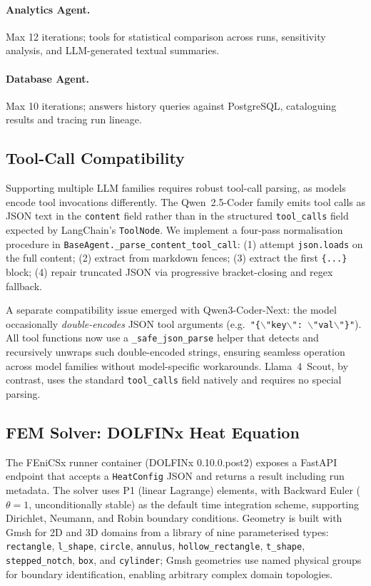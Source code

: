 \documentclass[twocolumn]{article}
\begin{document}
\paragraph{Analytics Agent.}
Max 12 iterations; tools for statistical comparison across runs,
sensitivity analysis, and LLM-generated textual summaries.

\paragraph{Database Agent.}
Max 10 iterations; answers history queries against PostgreSQL,
cataloguing results and tracing run lineage.

\subsection{Tool-Call Compatibility}
\label{sec:tool-compat}

Supporting multiple LLM families requires robust tool-call parsing, as
models encode tool invocations differently.  The Qwen~2.5-Coder family
emits tool calls as JSON text in the \texttt{content} field rather than in
the structured \texttt{tool\_calls} field expected by LangChain's
\texttt{ToolNode}.  We implement a four-pass normalisation procedure in
\texttt{BaseAgent.\_parse\_content\_tool\_call}:
(1) attempt \texttt{json.loads} on the full content;
(2) extract from markdown fences;
(3) extract the first \texttt{\{...\}} block;
(4) repair truncated JSON via progressive bracket-closing and regex fallback.

A separate compatibility issue emerged with Qwen3-Coder-Next: the model
occasionally \emph{double-encodes} JSON tool arguments (e.g.\
\texttt{"\{$\backslash$"key$\backslash$": $\backslash$"val$\backslash$"\}"}).
All tool functions now use a \texttt{\_safe\_json\_parse} helper that detects
and recursively unwraps such double-encoded strings, ensuring seamless
operation across model families without model-specific workarounds.
Llama~4~Scout, by contrast, uses the standard \texttt{tool\_calls} field
natively and requires no special parsing.

\subsection{FEM Solver: DOLFINx Heat Equation}

The FEniCSx runner container (DOLFINx 0.10.0.post2) exposes a FastAPI
endpoint that accepts a \texttt{HeatConfig} JSON and returns a result
including run metadata.  The solver uses P1 (linear Lagrange) elements,
with Backward Euler ($\theta = 1$, unconditionally stable) as the default
time integration scheme, supporting Dirichlet, Neumann, and Robin boundary
conditions.  Geometry is built with Gmsh \citep{geuzaine2009gmsh} for 2D
and 3D domains from a library of nine parameterised types: \texttt{rectangle},
\texttt{l\_shape}, \texttt{circle}, \texttt{annulus}, \texttt{hollow\_rectangle},
\texttt{t\_shape}, \texttt{stepped\_notch}, \texttt{box}, and \texttt{cylinder};
Gmsh geometries use named physical groups for boundary identification,
enabling arbitrary complex domain topologies.
\end{document}
